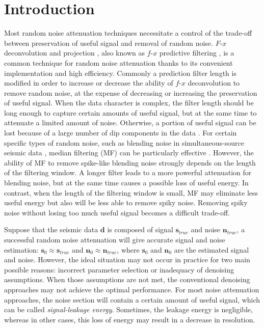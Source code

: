 \section{Introduction}
Most random noise attenuation techniques necessitate a control of the trade-off between preservation of useful signal and removal of random noise. $F$-$x$ deconvolution and projection \cite[]{canales,soubaras1995}, also known as $f$-$x$ predictive filtering \cite[]{bekara,yangkang2014}, is a common technique for random noise attenuation thanks to its convenient implementation and high efficiency. Commonly a prediction filter length is modified in order to increase or decrease the ability of $f$-$x$ deconvolution to remove random noise, at the expense of decreasing or increasing the preservation of useful signal. When the data character is complex, the filter length should be long enough to capture certain amounts of useful signal, but at the same time to attenuate a limited amount of noise. Otherwise, a portion of useful signal can be lost because of a large number of dip components in the data \cite[]{yangkang2014}. For certain specific types of random noise, such as blending noise in simultaneous-source seismic data \cite[]{beasleycj1998,berkhout2008,abma2010,yangkang20142}, median filtering (MF) can be particularly effective \cite[]{mediandeblend,yangkang2014svmf,yangkang2014nmo}. However, the ability of MF to remove spike-like blending noise strongly depends on the length of the filtering window. A longer filter leads to a more powerful attenuation for blending noise, but at the same time causes a possible loss of useful energy. In contrast, when the length of the filtering window is small, MF may eliminate less useful energy but also will be less able to remove spiky noise. Removing spiky noise without losing too much useful signal becomes a difficult trade-off. 

Suppose that the seismic data $\mathbf{d}$ is composed of signal $\mathbf{s}_{true}$ and noise $\mathbf{n}_{true}$, a successful random noise attenuation will give accurate signal and noise estimation: $\mathbf{s}_0\approx\mathbf{s}_{true}$ and $\mathbf{n}_0\approx\mathbf{n}_{true}$, where $\mathbf{s}_0$ and $\mathbf{n}_0$ are the estimated signal and noise. However, the ideal situation may not occur in practice for two main possible reasons: incorrect parameter selection or inadequacy  of denoising assumptions. When those assumptions are not met, the conventional denoising approaches may not achieve the optimal performance. For most noise attenuation approaches, the noise section will contain a certain amount of useful signal, which can be called \emph{signal-leakage energy}. Sometimes, the leakage energy is negligible, whereas in other cases, this loss of energy may result in a decrease in resolution. 

